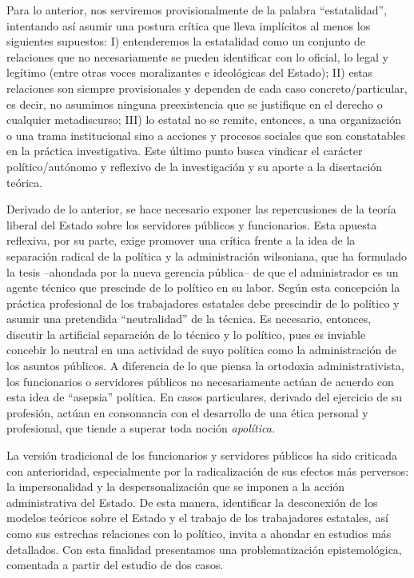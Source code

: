 \documentclass[
  spanish,
  11pt,
  a4paper,
]{scrbook}
\begin{document}
Para lo anterior, nos serviremos provisionalmente de la palabra
``estatalidad'', intentando así asumir una postura crítica que lleva
implícitos al menos los siguientes supuestos: I) entenderemos la
estatalidad como un conjunto de relaciones que no necesariamente se
pueden identificar con lo oficial, lo legal y legítimo (entre otras
voces moralizantes e ideológicas del Estado); II) estas relaciones son
siempre provisionales y dependen de cada caso concreto/particular, es
decir, no asumimos ninguna preexistencia que se justifique en el derecho
o cualquier metadiscurso; III) lo estatal no se remite, entonces, a una
organización o una trama institucional sino a acciones y procesos
sociales que son constatables en la práctica investigativa. Este último
punto busca vindicar el carácter político/autónomo y reflexivo de la
investigación y su aporte a la disertación teórica.

Derivado de lo anterior, se hace necesario exponer las repercusiones de
la teoría liberal del Estado sobre los servidores públicos y
funcionarios. Esta apuesta reflexiva, por su parte, exige promover una
crítica frente a la idea de la separación radical de la política y la
administración wilsoniana, que ha formulado la tesis --ahondada por la
nueva gerencia pública-- de que el administrador es un agente técnico
que prescinde de lo político en su labor. Según esta concepción la
práctica profesional de los trabajadores estatales debe prescindir de lo
político y asumir una pretendida ``neutralidad'' de la técnica. Es
necesario, entonces, discutir la artificial separación de lo técnico y
lo político, pues es inviable concebir lo neutral en una actividad de
suyo política como la administración de los asuntos públicos. A
diferencia de lo que piensa la ortodoxia administrativista, los
funcionarios o servidores públicos no necesariamente actúan de acuerdo
con esta idea de ``asepsia'' política. En casos particulares, derivado
del ejercicio de su profesión, actúan en consonancia con el desarrollo
de una ética personal y profesional, que tiende a superar toda noción
\emph{apolítica.}

La versión tradicional de los funcionarios y servidores públicos ha sido
criticada con anterioridad, especialmente por la radicalización de sus
efectos más perversos: la impersonalidad y la despersonalización
\autocite{Merton1999} que se imponen a la acción administrativa del
Estado. De esta manera, identificar la desconexión de los modelos
teóricos sobre el Estado y el trabajo de los trabajadores estatales, así
como sus estrechas relaciones con lo político, invita a ahondar en
estudios más detallados. Con esta finalidad presentamos una
problematización epistemológica, comentada a partir del estudio de dos
casos.
\end{document}
